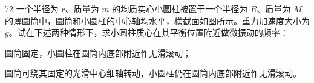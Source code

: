 \begin{problem}[第34届物理竞赛复赛][圆柱微振动]{72}
    一个半径为 $r$、质量为 $m$ 的均质实心小圆柱被置于一个半径为 $R$、质量为 $M$ 的薄圆筒中，圆筒和小圆柱的中心轴均水平，横截面如图所示。重力加速度大小为 $g$。试在下述两种情形下，求小圆柱质心在其平衡位置附近做微振动的频率：
    \begin{subproblem}
        圆筒固定，小圆柱在圆筒内底部附近作无滑滚动；
    \end{subproblem}
    \begin{subproblem}
        圆筒可绕其固定的光滑中心细轴转动，小圆柱仍在圆筒内底部附近作无滑滚动。
    \end{subproblem}
\end{problem}












